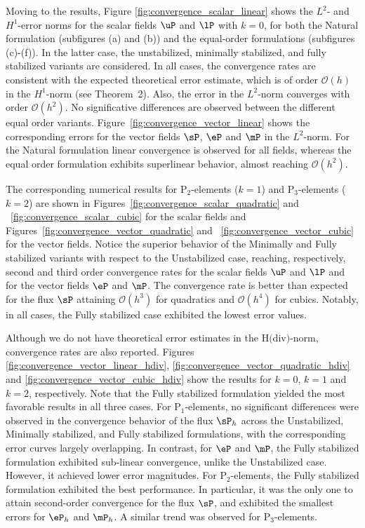 Moving to the results, Figure \ref{fig:convergence_scalar_linear} shows the $L^{2}$- and $H^{1}$-error norms for the scalar fields $\uP$ and $\lP$ with $k=0$, for both the Natural formulation (subfigures (a) and (b)) and the equal-order formulations (subfigures (c)-(f)). In the latter case, the unstabilized, minimally stabilized, and fully stabilized variants are considered. In all cases, the convergence rates are consistent with the expected theoretical error estimate, which is of order $\mathcal{O}(h)$ in the $H^{1}$-norm (see Theorem~2). Also, the error in the $ L^{2} $-norm converges with order $ \mathcal{O}(h^2) $.
No significative differences are observed between the different equal order variants.
Figure~\ref{fig:convergence_vector_linear} shows the corresponding errors for the vector fields
$\sP$, $\eP$ and $\mP$ in the $ L^{2} $-norm. For the Natural formulation linear convergence is observed for all fields, whereas the equal order formulation exhibits superlinear behavior, almost reaching $ \mathcal{O}(h^2) $. 

The corresponding numerical results for $\text{P}_2$-elements ($k=1$) and $\text{P}_3$-elements ($k=2$) are shown in Figures~\ref{fig:convergence_scalar_quadratic} and ~\ref{fig:convergence_scalar_cubic}
for the scalar fields and Figures~\ref{fig:convergence_vector_quadratic} and ~\ref{fig:convergence_vector_cubic}
for the vector fields. Notice the superior behavior of the Minimally and Fully stabilized 
variants with respect to the Unstabilized case, reaching, respectively, second and third order convergence rates for the scalar fields $\uP$ and $\lP$ and for the vector
fields $\eP$ and $\mP$. The convergence rate is better than expected
for the flux $\sP$ attaining $ \mathcal{O}(h^3) $ for quadratics and $ \mathcal{O}(h^4) $ 
for cubics. Notably, in all cases, the Fully stabilized case exhibited the lowest error values.

Although we do not have theoretical error estimates in the $ \text{H(div)} $-norm, 
convergence rates are also reported. Figures \ref{fig:convergence_vector_linear_hdiv}, 
\ref{fig:convergence_vector_quadratic_hdiv} and \ref{fig:convergence_vector_cubic_hdiv}
show the results for $k=0$, $k=1$ and $k=2$, respectively.
Note that the Fully stabilized formulation yielded the most favorable results in all three cases. For $ \text{P}_1 $-elements, no significant differences were observed in the convergence behavior of the flux $ \sP_{h} $ across the Unstabilized, Minimally stabilized, and Fully stabilized formulations, with the corresponding error curves largely overlapping. In contrast, for $ \eP $ and $ \mP $, the Fully stabilized formulation exhibited sub-linear convergence, unlike the Unstabilized case. However, it achieved lower error magnitudes. For $ \text{P}_2 $-elements, the Fully stabilized formulation exhibited the best performance. In particular, it was the only one to attain second-order convergence for the flux $ \sP $, and exhibited the smallest errors for $ \eP_{h} $ and $ \mP_{h} $. A similar trend was observed for $ \text{P}_3 $-elements. 

